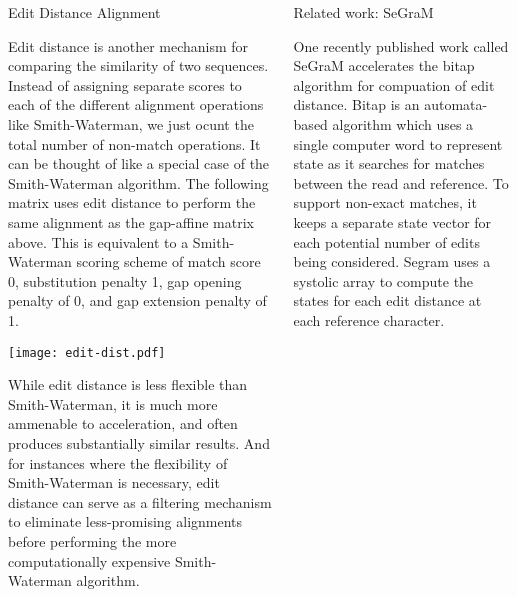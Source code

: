 \documentclass{cbxposter}
\renewcommand{\smallskip}{\vspace{0.16667in}}
\begin{document}
\begin{frame}[fragile,t]{}
\begin{columns}[T]
\begin{column}{10.5in}
\vspace{0.67in}
\begin{block}{Edit Distance Alignment}
  \smallskip

  Edit distance is another mechanism for comparing the similarity of two
  sequences. Instead of assigning separate scores to each of the different
  alignment operations like Smith-Waterman, we just ocunt the total number
  of non-match operations. It can be thought of like a special case of the
  Smith-Waterman algorithm. The following matrix uses edit distance to
  perform the same alignment as the gap-affine matrix above. This is
  equivalent to a Smith-Waterman scoring scheme of match score 0,
  substitution penalty 1, gap opening penalty of 0, and gap extension
  penalty of 1.

  \begin{center}
    \texttt{[image: edit-dist.pdf]}
  \end{center}

  While edit distance is less flexible than Smith-Waterman, it is much more
  ammenable to acceleration, and often produces substantially similar results.
  And for instances where the flexibility of Smith-Waterman is necessary, edit
  distance can serve as a filtering mechanism to eliminate less-promising
  alignments before performing the more computationally expensive Smith-Waterman
  algorithm.

\end{block}

\end{column}


\begin{column}{10.5in}
\vspace{0.4in}


\begin{block}{Related work: SeGraM}
  \smallskip

  One recently published work called SeGraM accelerates the bitap algorithm
  for compuation of edit distance. Bitap is an automata-based algorithm which
  uses a single computer word to represent state as it searches for matches
  between the read and reference. To support non-exact matches, it keeps a
  separate state vector for each potential number of edits being considered.
  Segram uses a systolic array to compute the states for each edit distance
  at each reference character.


\end{block}
\end{column}
\end{columns}
\end{frame}
\end{document}

